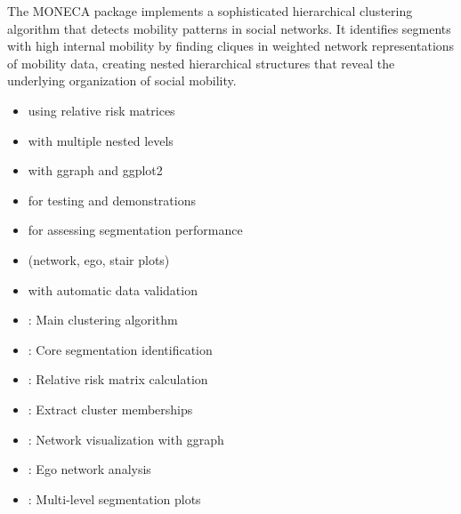 \documentclass[a4paper]{book}
\begin{document}
%
\begin{Details}
The MONECA package implements a sophisticated hierarchical clustering algorithm
that detects mobility patterns in social networks. It identifies segments with
high internal mobility by finding cliques in weighted network representations
of mobility data, creating nested hierarchical structures that reveal the
underlying organization of social mobility.

\begin{itemize}

\item{}  using relative risk matrices
\item{}  with multiple nested levels
\item{}  with ggraph and ggplot2
\item{}  for testing and demonstrations
\item{}  for assessing segmentation performance
\item{}  (network, ego, stair plots)
\item{}  with automatic data validation

\end{itemize}


\begin{itemize}

\item{} : Main clustering algorithm
\item{} : Core segmentation identification
\item{} : Relative risk matrix calculation
\item{} : Extract cluster memberships

\end{itemize}


\begin{itemize}

\item{} : Network visualization with ggraph
\item{} : Ego network analysis
\item{} : Multi-level segmentation plots


\end{itemize}
\end{Details}
\end{document}
